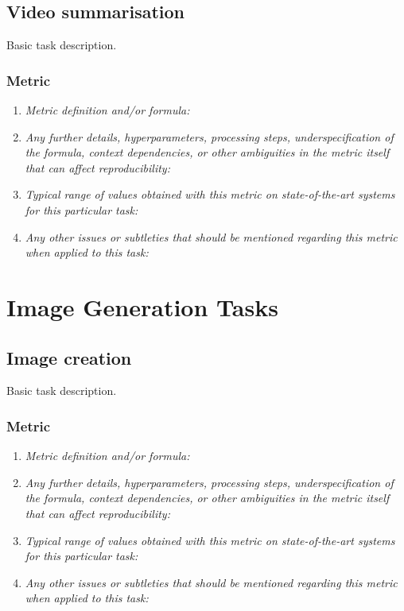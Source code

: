 \documentclass[a4paper,11pt]{article}
\begin{document}
    \subsection{Video summarisation}
    Basic task description.
    \subsubsection{Metric}
        \begin{enumerate}[label=\alph*.]
            \item \textit{Metric definition and/or formula:}
            \bigskip
            \item \textit{Any further details, hyperparameters, processing steps, underspecification of the formula, context dependencies, or other ambiguities in the metric itself that can affect reproducibility:}
            \bigskip
            \item \textit{Typical range of values obtained with this metric on state-of-the-art systems for this particular task:}
            \bigskip
            \item \textit{Any other issues or subtleties that should be mentioned regarding this metric when applied to this task:}
            \bigskip
        \end{enumerate}

\section{Image Generation Tasks}
    \subsection{Image creation} \label{image_creation}
        Basic task description.
        \subsubsection{Metric}
            \begin{enumerate}[label=\alph*.]
                \item \textit{Metric definition and/or formula:}
                \bigskip
                \item \textit{Any further details, hyperparameters, processing steps, underspecification of the formula, context dependencies, or other ambiguities in the metric itself that can affect reproducibility:}
                \bigskip
                \item \textit{Typical range of values obtained with this metric on state-of-the-art systems for this particular task:}
                \bigskip
                \item \textit{Any other issues or subtleties that should be mentioned regarding this metric when applied to this task:}
                \bigskip
            \end{enumerate}
\end{document}
